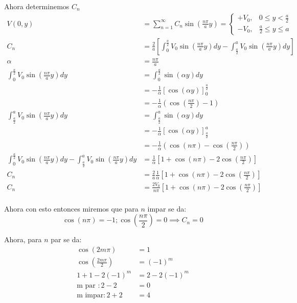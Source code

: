 \documentclass{report}
\begin{document}
Ahora determinemos $C_n$
\begin{align*}
	V(0, y) &= \sum_{n = 1}^{\infty} C_n\sin \left( \frac{n\pi}{a}y \right) = \begin{cases}+V_0, & 0 \le y < \frac{a}{2} \\ -V_0, & \frac{a}{2} \le y \le a \end{cases}\\
		C_n &= \frac{2}{a}\left[ \int_0^{\frac{a}{2}} V_0 \sin \left( \frac{n\pi}{a} y \right)dy - \int_{\frac{a}{2}}^a V_0 \sin \left( \frac{n\pi}{a}y \right) dy\right]\\
		\alpha &= \frac{n\pi}{a}\\
		\int_0^{\frac{a}{2}} V_0 \sin \left( \frac{n\pi}{a} y \right)dy &= \int_0^{\frac{a}{2}} \sin \left( \alpha y \right)dy\\
		&= - \frac{1}{\alpha} \left[ \cos \left( \alpha y \right)\right]_{0}^{\frac{a}{2}}\\
		&= - \frac{1}{\alpha} \left( \cos \left( \frac{n\pi}{2} \right) - 1\right)\\
		\int_{\frac{a}{2}}^a V_0 \sin \left( \frac{n\pi}{a}y \right) dy &= \int_{\frac{a}{2}}^a \sin \left( \alpha y \right) dy\\
		&= - \frac{1}{\alpha} \left[ \cos \left( \alpha y \right) \right]_{\frac{a}{2}}^{a}\\
		&= - \frac{1}{\alpha} \left( \cos \left( n\pi \right) - \cos \left( \frac{n\pi}{2} \right) \right)\\
		\int_0^{\frac{a}{2}} V_0 \sin \left( \frac{n\pi}{a} y \right)dy -\int_{\frac{a}{2}}^a V_0 \sin \left( \frac{n\pi}{a}y \right) dy &= \frac{1}{\alpha} \left[ 1 + \cos \left( n\pi \right) - 2\cos \left( \frac{n\pi}{2} \right) \right]\\
		C_n &= \frac{2}{a} \frac{1}{\alpha} \left[ 1 + \cos \left( n\pi \right) - 2\cos \left( \frac{n\pi}{2} \right) \right]\\
		C_n &= \frac{2 V_0}{n\pi} \left[ 1 + \cos \left( n\pi \right) - 2\cos \left( \frac{n\pi}{2} \right) \right]\\
\end{align*}

Ahora con esto entonces miremos que para $n$ impar se da: \[
	\cos \left( n\pi \right) = - 1; \cos \left( \frac{n\pi}{2} \right) = 0 \implies C_n = 0
\]

Ahora, para $n$ par se da:
\begin{align*}
	\cos \left( 2m\pi \right) &= 1\\
	\cos \left( \frac{2m\pi}{2} \right)  &= \left( -1 \right)^m\\
	1 + 1 - 2 \left( -1 \right)^m &= 2 - 2 \left( -1 \right)^m\\
	\text{m par }: 2 - 2 &= 0\\
	\text{m impar}: 2 + 2 &= 4\\
\end{align*}
\end{document}
